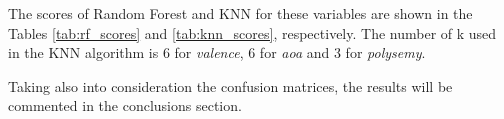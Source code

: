 \documentclass[a4paper,11pt,dvipsnames]{article}
\begin{document}
    The scores of Random Forest and KNN for these variables are shown in the Tables \ref{tab:rf_scores} and \ref{tab:knn_scores}, respectively. The number of k used in the KNN algorithm is 6 for \textit{valence}, 6 for \textit{aoa} and 3 for \textit{polysemy}.
    
Taking also into consideration the confusion matrices, the results will be commented in the conclusions section.
    

\begin{minipage}{0.48\linewidth}
    \centering
    \begin{table}[H]

    \centering
            \caption{Score values of Random Forest}\label{tab:rf_scores}
    \end{table}
    \end{minipage}
    \hfil
\end{document}
